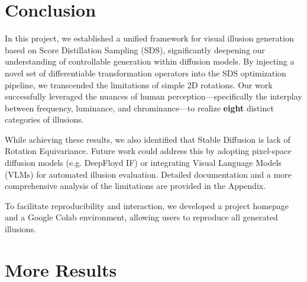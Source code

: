 \documentclass{article}
\begin{document}

\section{Conclusion}

In this project, we established a unified framework for visual illusion generation based on Score Distillation Sampling (SDS), significantly deepening our understanding of controllable generation within diffusion models. By injecting a novel set of differentiable transformation operators into the SDS optimization pipeline, we transcended the limitations of simple 2D rotations. Our work successfully leveraged the nuances of human perception—specifically the interplay between frequency, luminance, and chrominance—to realize \textbf{eight} distinct categories of illusions.



While achieving these results, we also identified that Stable Diffusion is lack of Rotation Equivariance. Future work could address this by adopting pixel-space diffusion models (e.g. DeepFloyd IF) or integrating Visual Language Models (VLMs) for automated illusion evaluation. Detailed documentation and a more comprehensive analysis of the limitations are provided in the Appendix.

To facilitate reproducibility and interaction, we developed a project homepage and a Google Colab environment, allowing users to reproduce all generated illusions. 

\newpage 





\newpage
\appendix

\raggedbottom 

\section{More Results}
\end{document}
